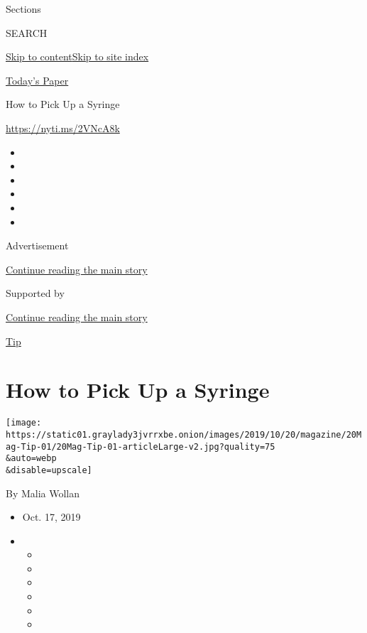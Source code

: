 Sections

SEARCH

\protect\hyperlink{site-content}{Skip to
content}\protect\hyperlink{site-index}{Skip to site index}

\href{https://myaccount.nytimes3xbfgragh.onion/auth/login?response_type=cookie\&client_id=vi}{}

\href{https://www.nytimes3xbfgragh.onion/section/todayspaper}{Today's
Paper}

How to Pick Up a Syringe

\url{https://nyti.ms/2VNcA8k}

\begin{itemize}
\item
\item
\item
\item
\item
\item
\end{itemize}

Advertisement

\protect\hyperlink{after-top}{Continue reading the main story}

Supported by

\protect\hyperlink{after-sponsor}{Continue reading the main story}

\href{/column/magazine-tip}{Tip}

\hypertarget{how-to-pick-up-a-syringe}{%
\section{How to Pick Up a Syringe}\label{how-to-pick-up-a-syringe}}

\texttt{[image: https://static01.graylady3jvrrxbe.onion/images/2019/10/20/magazine/20Mag-Tip-01/20Mag-Tip-01-articleLarge-v2.jpg?quality=75\\\&auto=webp\\\&disable=upscale]}

By Malia Wollan

\begin{itemize}
\item
  Oct. 17, 2019
\item
  \begin{itemize}
  \item
  \item
  \item
  \item
  \item
  \item
  \end{itemize}
\end{itemize}

